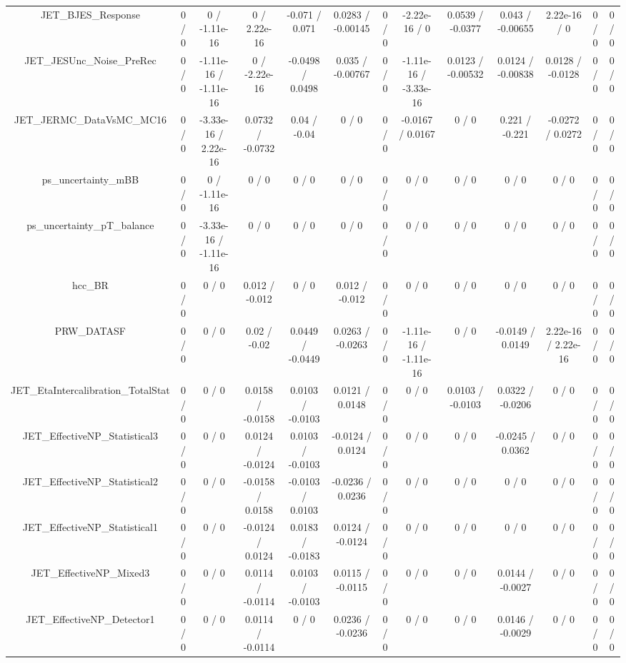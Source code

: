 \documentclass[10pt]{article}
\begin{document}
\begin{table}[htbp]
\begin{center}
\begin{tabular}{|c|c|c|c|c|c|c|c|c|c|c|c|c|}
  JET_BJES_Response & 0 / 0 & 0 / -1.11e-16 & 0 / 2.22e-16 & -0.071 / 0.071 & 0.0283 / -0.00145 & 0 / 0 & -2.22e-16 / 0 & 0.0539 / -0.0377 & 0.043 / -0.00655 & 2.22e-16 / 0 & 0 / 0 & 0 / 0 \\ 
  JET_JESUnc_Noise_PreRec & 0 / 0 & -1.11e-16 / -1.11e-16 & 0 / -2.22e-16 & -0.0498 / 0.0498 & 0.035 / -0.00767 & 0 / 0 & -1.11e-16 / -3.33e-16 & 0.0123 / -0.00532 & 0.0124 / -0.00838 & 0.0128 / -0.0128 & 0 / 0 & 0 / 0 \\ 
  JET_JERMC_DataVsMC_MC16 & 0 / 0 & -3.33e-16 / 2.22e-16 & 0.0732 / -0.0732 & 0.04 / -0.04 & 0 / 0 & 0 / 0 & -0.0167 / 0.0167 & 0 / 0 & 0.221 / -0.221 & -0.0272 / 0.0272 & 0 / 0 & 0 / 0 \\ 
  ps_uncertainty_mBB & 0 / 0 & 0 / -1.11e-16 & 0 / 0 & 0 / 0 & 0 / 0 & 0 / 0 & 0 / 0 & 0 / 0 & 0 / 0 & 0 / 0 & 0 / 0 & 0 / 0 \\ 
  ps_uncertainty_pT_balance & 0 / 0 & -3.33e-16 / -1.11e-16 & 0 / 0 & 0 / 0 & 0 / 0 & 0 / 0 & 0 / 0 & 0 / 0 & 0 / 0 & 0 / 0 & 0 / 0 & 0 / 0 \\ 
  hcc_BR & 0 / 0 & 0 / 0 & 0.012 / -0.012 & 0 / 0 & 0.012 / -0.012 & 0 / 0 & 0 / 0 & 0 / 0 & 0 / 0 & 0 / 0 & 0 / 0 & 0 / 0 \\ 
  PRW_DATASF & 0 / 0 & 0 / 0 & 0.02 / -0.02 & 0.0449 / -0.0449 & 0.0263 / -0.0263 & 0 / 0 & -1.11e-16 / -1.11e-16 & 0 / 0 & -0.0149 / 0.0149 & 2.22e-16 / 2.22e-16 & 0 / 0 & 0 / 0 \\ 
  JET_EtaIntercalibration_TotalStat & 0 / 0 & 0 / 0 & 0.0158 / -0.0158 & 0.0103 / -0.0103 & 0.0121 / 0.0148 & 0 / 0 & 0 / 0 & 0.0103 / -0.0103 & 0.0322 / -0.0206 & 0 / 0 & 0 / 0 & 0 / 0 \\ 
  JET_EffectiveNP_Statistical3 & 0 / 0 & 0 / 0 & 0.0124 / -0.0124 & 0.0103 / -0.0103 & -0.0124 / 0.0124 & 0 / 0 & 0 / 0 & 0 / 0 & -0.0245 / 0.0362 & 0 / 0 & 0 / 0 & 0 / 0 \\ 
  JET_EffectiveNP_Statistical2 & 0 / 0 & 0 / 0 & -0.0158 / 0.0158 & -0.0103 / 0.0103 & -0.0236 / 0.0236 & 0 / 0 & 0 / 0 & 0 / 0 & 0 / 0 & 0 / 0 & 0 / 0 & 0 / 0 \\ 
  JET_EffectiveNP_Statistical1 & 0 / 0 & 0 / 0 & -0.0124 / 0.0124 & 0.0183 / -0.0183 & 0.0124 / -0.0124 & 0 / 0 & 0 / 0 & 0 / 0 & 0 / 0 & 0 / 0 & 0 / 0 & 0 / 0 \\ 
  JET_EffectiveNP_Mixed3 & 0 / 0 & 0 / 0 & 0.0114 / -0.0114 & 0.0103 / -0.0103 & 0.0115 / -0.0115 & 0 / 0 & 0 / 0 & 0 / 0 & 0.0144 / -0.0027 & 0 / 0 & 0 / 0 & 0 / 0 \\ 
  JET_EffectiveNP_Detector1 & 0 / 0 & 0 / 0 & 0.0114 / -0.0114 & 0 / 0 & 0.0236 / -0.0236 & 0 / 0 & 0 / 0 & 0 / 0 & 0.0146 / -0.0029 & 0 / 0 & 0 / 0 & 0 / 0 \\ 

\end{tabular}
\end{center}
\end{table}
\end{document}
